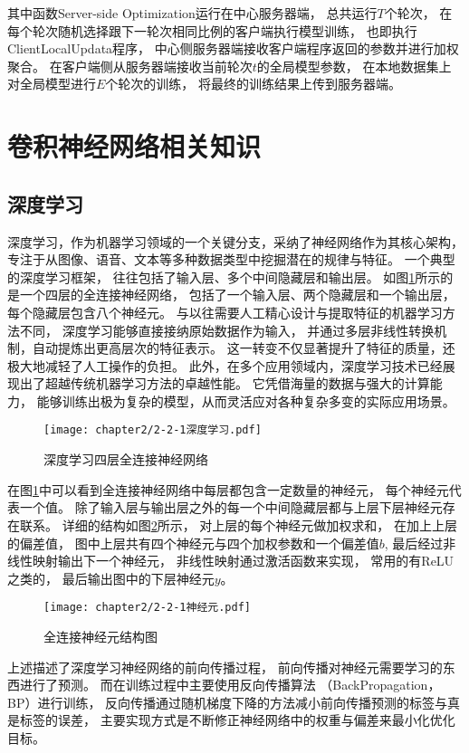 其中函数Server-side Optimization运行在中心服务器端，
总共运行$T$个轮次，
在每个轮次随机选择跟下一轮次相同比例的客户端执行模型训练，
也即执行ClientLocalUpdata程序，
中心侧服务器端接收客户端程序返回的参数并进行加权聚合。
在客户端侧从服务器端接收当前轮次$t$的全局模型参数，
在本地数据集上对全局模型进行$E$个轮次的训练，
将最终的训练结果上传到服务器端。

\section{卷积神经网络相关知识}
\subsection{深度学习}
深度学习，作为机器学习领域的一个关键分支，采纳了神经网络作为其核心架构，
专注于从图像、语音、文本等多种数据类型中挖掘潜在的规律与特征。
一个典型的深度学习框架，
往往包括了输入层、多个中间隐藏层和输出层。
如图\ref{fig:2-2-1}所示的是一个四层的全连接神经网络，
包括了一个输入层、两个隐藏层和一个输出层，
每个隐藏层包含八个神经元。
与以往需要人工精心设计与提取特征的机器学习方法不同，
深度学习能够直接接纳原始数据作为输入，
并通过多层非线性转换机制，自动提炼出更高层次的特征表示。
这一转变不仅显著提升了特征的质量，还极大地减轻了人工操作的负担。
此外，在多个应用领域内，深度学习技术已经展现出了超越传统机器学习方法的卓越性能。
它凭借海量的数据与强大的计算能力，
能够训练出极为复杂的模型，从而灵活应对各种复杂多变的实际应用场景。
\begin{figure}[H]
    \centering
    \texttt{[image: chapter2/2-2-1深度学习.pdf]}
    \caption{\label{fig:2-2-1}深度学习四层全连接神经网络}
\end{figure}
在图\ref{fig:2-2-1}中可以看到全连接神经网络中每层都包含一定数量的神经元，
每个神经元代表一个值。
除了输入层与输出层之外的每一个中间隐藏层都与上层下层神经元存在联系。
详细的结构如图\ref{fig:2-2-1-neuron}所示，
对上层的每个神经元做加权求和，
在加上上层的偏差值，
图中上层共有四个神经元与四个加权参数和一个偏差值$b$,
最后经过非线性映射输出下一个神经元，
非线性映射通过激活函数来实现，
常用的有ReLU之类的，
最后输出图中的下层神经元$y$。
\begin{figure}[H]
    \centering
    \texttt{[image: chapter2/2-2-1神经元.pdf]}
    \caption{\label{fig:2-2-1-neuron}全连接神经元结构图}
\end{figure}
上述描述了深度学习神经网络的前向传播过程，
前向传播对神经元需要学习的东西进行了预测。
而在训练过程中主要使用反向传播算法\cite{lecun1989backpropagation}
（BackPropagation，BP）进行训练，
反向传播通过随机梯度下降的方法减小前向传播预测的标签与真是标签的误差，
主要实现方式是不断修正神经网络中的权重与偏差来最小化优化目标。


